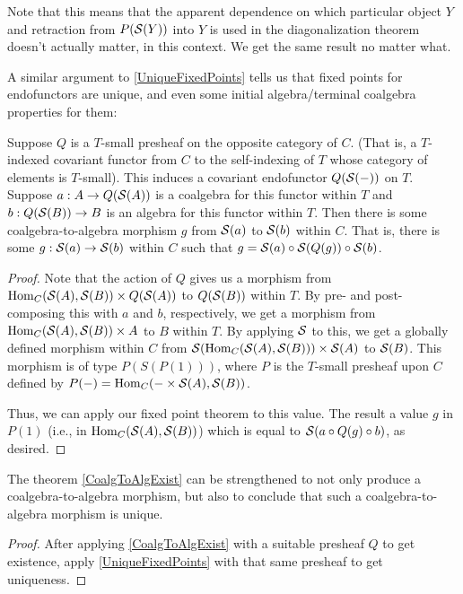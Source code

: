 \begin{observation}
Note that this means that the apparent dependence on which particular object $Y$ and retraction from $P(\mathcal{S}(Y))$ into $Y$ is used in the diagonalization theorem doesn't actually matter, in this context. We get the same result no matter what.
\end{observation}

A similar argument to \cref{UniqueFixedPoints} tells us that fixed points for endofunctors are unique, and even some initial algebra/terminal coalgebra properties for them: \TODO

\begin{theorem}\label{CoalgToAlgExist}
Suppose $Q$ is a $T$-small presheaf on the opposite category of $C$. (That is, a $T$-indexed covariant functor from $C$ to the self-indexing of $T$ whose category of elements is $T$-small). This induces a covariant endofunctor $Q(\mathcal{S}(-))$ on $T$. Suppose $a : A \to Q(\mathcal{S}(A))$ is a coalgebra for this functor within $T$ and $b : Q(\mathcal{S}(B)) \to B$ is an algebra for this functor within $T$. Then there is some coalgebra-to-algebra morphism $g$ from $\mathcal{S}(a)$ to $\mathcal{S}(b)$ within $C$. That is, there is some $g : \mathcal{S}(a) \to \mathcal{S}(b)$ within $C$ such that $g = \mathcal{S}(a) \circ \mathcal{S}(Q(g)) \circ \mathcal{S}(b)$.
\end{theorem}
\begin{proof}
Note that the action of $Q$ gives us a morphism from $\operatorname{Hom}_C(\mathcal{S}(A), \mathcal{S}(B)) \times Q(\mathcal{S}(A))$ to $Q(\mathcal{S}(B))$ within $T$. By pre- and post-composing this with $a$ and $b$, respectively, we get a morphism from $\operatorname{Hom}_C(\mathcal{S}(A), \mathcal{S}(B)) \times A$ to $B$ within $T$. By applying $\mathcal{S}$ to this, we get a globally defined morphism within $C$ from $\mathcal{S}(\operatorname{Hom}_C(\mathcal{S}(A), \mathcal{S}(B))) \times \mathcal{S}(A)$ to $\mathcal{S}(B)$. This morphism is of type $P(S(P(1)))$, where $P$ is the $T$-small presheaf upon $C$ defined by $P(-) = \operatorname{Hom}_C(- \times \mathcal{S}(A), \mathcal{S}(B))$.

Thus, we can apply our fixed point theorem  to this value. The result a value $g$ in $P(1)$ (i.e., in $\operatorname{Hom}_C(\mathcal{S}(A), \mathcal{S}(B))$) which is equal to $\mathcal{S}(a \circ Q(g) \circ b)$, as desired.

\end{proof}

\begin{theorem}
The theorem \cref{CoalgToAlgExist} can be strengthened to not only produce a coalgebra-to-algebra morphism, but also to conclude that such a coalgebra-to-algebra morphism is unique.
\end{theorem}
\begin{proof}
After applying \cref{CoalgToAlgExist} with a suitable presheaf $Q$ to get existence, apply \cref{UniqueFixedPoints} with that same presheaf to get uniqueness.
\end{proof}

